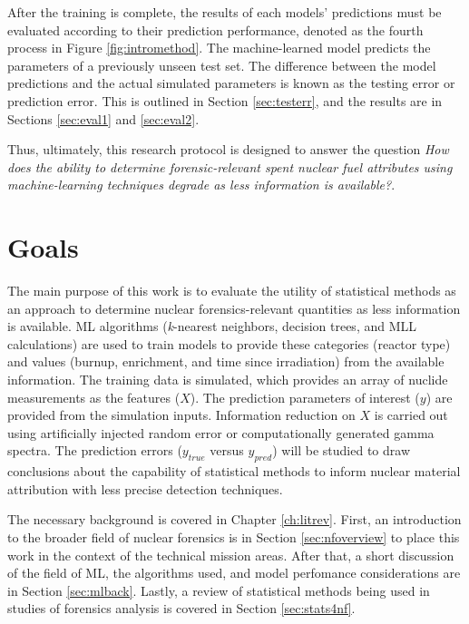 After the training is complete, the results of each models' predictions must be
evaluated according to their prediction performance, denoted as the fourth
process in Figure \ref{fig:intromethod}.  The machine-learned model predicts
the parameters of a previously unseen test set.  The difference between the
model predictions and the actual simulated parameters is known as the testing
error or prediction error. This is outlined in Section \ref{sec:testerr}, and
the results are in Sections \ref{sec:eval1} and \ref{sec:eval2}.

Thus, ultimately, this research protocol is designed to answer the question
\textit{How does the ability to determine forensic-relevant spent nuclear fuel
attributes using machine-learning techniques degrade as less information is
available?}. 

\section{Goals}

The main purpose of this work is to evaluate the utility of statistical methods
as an approach to determine nuclear forensics-relevant quantities as less
information is available. \Gls{ML} algorithms (\textit{k}-nearest neighbors,
decision trees, and \gls{MLL} calculations) are used to train models to provide
these categories (reactor type) and values (burnup, enrichment, and time since
irradiation) from the available information.  The training data is simulated,
which provides an array of nuclide measurements as the features ($X$). The
prediction parameters of interest ($y$) are provided from the simulation
inputs. Information reduction on $X$ is carried out using artificially injected
random error or computationally generated gamma spectra. The prediction errors
($y_{true}$ versus $y_{pred}$) will be studied to draw conclusions about the
capability of statistical methods to inform nuclear material attribution with
less precise detection techniques.

The necessary background is covered in Chapter \ref{ch:litrev}.  First, an
introduction to the broader field of nuclear forensics is in Section
\ref{sec:nfoverview} to place this work in the context of the technical mission
areas. After that, a short discussion of the field of \gls{ML}, the algorithms
used, and model perfomance considerations are in Section \ref{sec:mlback}.
Lastly, a review of statistical methods being used in studies of forensics
analysis is covered in Section \ref{sec:stats4nf}. 

